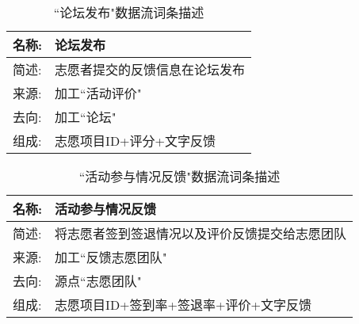 \begin{table}[H]  
    \caption{``论坛发布"数据流词条描述}  
    \begin{center}  
        \begin{tabular}{l p{11cm}} 
            \hline
            \quad 名称: & 论坛发布 \\
            \hline
            \quad 简述: & 志愿者提交的反馈信息在论坛发布 \\
            \hline
            \quad 来源: & 加工``活动评价" \\
            \hline
            \quad 去向: & 加工``论坛" \\
            \hline
            \quad 组成: & 志愿项目ID+评分+文字反馈  \\
            \hline
        \end{tabular}
        \label{tab1}
    \end{center}
    \end{table}



\begin{table}[H]  
    \caption{``活动参与情况反馈"数据流词条描述}  
    \begin{center}  
        \begin{tabular}{l p{11cm}} 
            \hline
            \quad 名称: & 活动参与情况反馈 \\
            \hline
            \quad 简述: & 将志愿者签到签退情况以及评价反馈提交给志愿团队 \\
            \hline
            \quad 来源: & 加工``反馈志愿团队" \\
            \hline
            \quad 去向: & 源点``志愿团队" \\
            \hline
            \quad 组成: & 志愿项目ID+签到率+签退率+评价+文字反馈  \\
            \hline
        \end{tabular}
        \label{tab1}
    \end{center}
    \end{table}
